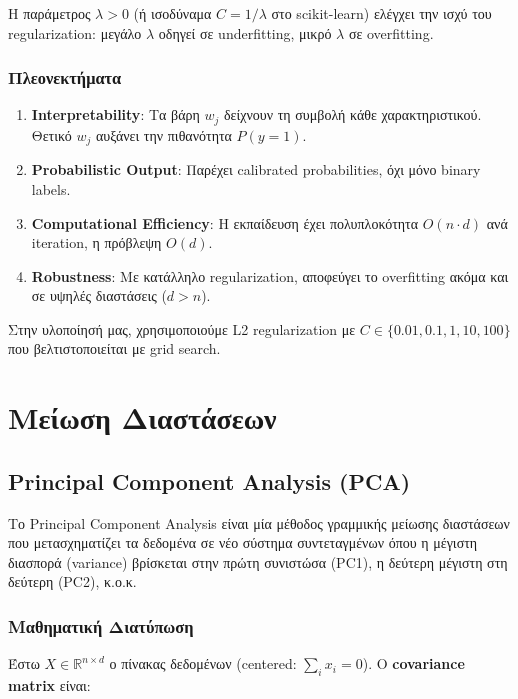 \documentclass[12pt,a4paper,twoside]{book}
\begin{document}
Η παράμετρος \(\lambda > 0\) (ή ισοδύναμα \(C = 1/\lambda\) στο scikit-learn) ελέγχει την ισχύ του regularization: μεγάλο \(\lambda\) οδηγεί σε underfitting, μικρό \(\lambda\) σε overfitting.

\subsubsection*{Πλεονεκτήματα}

\begin{enumerate}
    \item \textbf{Interpretability}: Τα βάρη \(w_j\) δείχνουν τη συμβολή κάθε χαρακτηριστικού. Θετικό \(w_j\) αυξάνει την πιθανότητα \(P(y=1)\).

    \item \textbf{Probabilistic Output}: Παρέχει calibrated probabilities, όχι μόνο binary labels.

    \item \textbf{Computational Efficiency}: Η εκπαίδευση έχει πολυπλοκότητα \(O(n \cdot d)\) ανά iteration, η πρόβλεψη \(O(d)\).
    \item \textbf{Robustness}: Με κατάλληλο regularization, αποφεύγει το overfitting ακόμα και σε υψηλές διαστάσεις (\(d > n\)).
\end{enumerate}

Στην υλοποίησή μας, χρησιμοποιούμε L2 regularization με \(C \in \{0.01, 0.1, 1, 10, 100\}\) που βελτιστοποιείται με grid search.
\section{Μείωση Διαστάσεων}

\subsection{Principal Component Analysis (PCA)}

Το Principal Component Analysis είναι μία μέθοδος γραμμικής μείωσης διαστάσεων που μετασχηματίζει τα δεδομένα σε νέο σύστημα συντεταγμένων όπου η μέγιστη διασπορά (variance) βρίσκεται στην πρώτη συνιστώσα (PC1), η δεύτερη μέγιστη στη δεύτερη (PC2), κ.ο.κ.

\subsubsection*{Μαθηματική Διατύπωση}

Έστω \(X \in \mathbb{R}^{n \times d}\) ο πίνακας δεδομένων (centered: \(\sum_i x_i = 0\)). Ο \textbf{covariance matrix} είναι:
\end{document}
